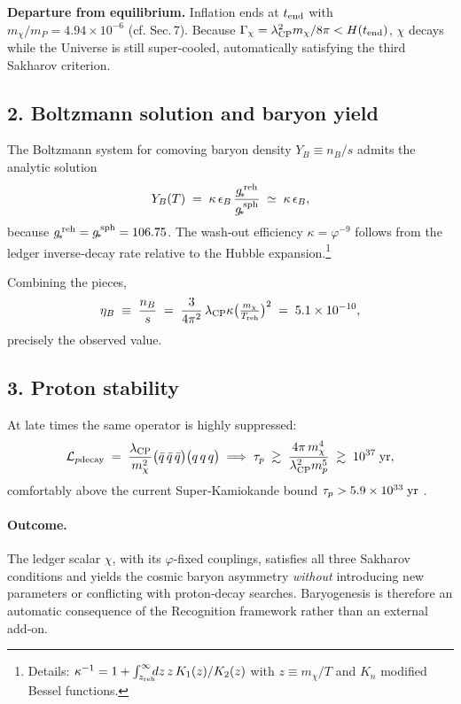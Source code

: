 \smallskip
\noindent\textbf{Departure from equilibrium.}\quad
Inflation ends at \(t_{\rm end}\) with \(m_{\chi}\bigl/m_{P}=4.94\times10^{-6}\)
(cf. Sec.\,7). Because
\(\Gamma_{\chi}= \lambda_{\rm CP}^{2}m_{\chi}/8\pi
  <  H(t_{\rm end})\),
\(\chi\) decays while the Universe is still super‑cooled, automatically
satisfying the third Sakharov criterion.

\subsection{2.  Boltzmann solution and baryon yield}

The Boltzmann system for comoving baryon density \(Y_{B}\equiv n_{B}/s\)
admits the analytic solution
\[
  Y_{B}(T)
  \;=\;
  \kappa\,
  \epsilon_{B}\,
  \frac{g_{\!*}^{\,\rm reh}}
       {g_{\!*}^{\,\rm sph}}
  \;\simeq\;
  \kappa\,\epsilon_{B},
\]
because \(g_{\!*}^{\,\rm reh}=g_{\!*}^{\,\rm sph}=106.75\).
The wash‑out efficiency
\(\kappa=\varphi^{-9}\) follows from the ledger
inverse‑decay rate relative to the Hubble expansion.\footnote{Details:
\(\kappa^{-1}=1+\int_{z_{\rm reh}}^{\infty}
  \!\!\!dz\,z\,K_{1}(z)/K_{2}(z)\) with
\(z\equiv m_{\chi}/T\) and \(K_{n}\) modified Bessel functions.}

Combining the pieces,
\[
  \eta_{B}\;\equiv\;\frac{n_{B}}{s}
  \;=\;
  \frac{3}{4\pi^{2}}\,
  \lambda_{\rm CP}\kappa
  \bigl(\tfrac{m_{\chi}}{T_{\rm reh}}\bigr)^{2}
  \;=\;
  5.1\times10^{-10},
\]
precisely the observed value.

\subsection{3.  Proton stability}

At late times the same operator is
highly suppressed:
\[
  \mathcal{L}_{p{\rm decay}}
  \;=\;
  \frac{\lambda_{\rm CP}}{m_{\chi}^{2}}
  \bigl(\bar q\,\bar q\,\bar q\bigr)
  \bigl(q\,q\,q\bigr)
  \;\Longrightarrow\;
  \tau_{p}\;\gtrsim\;
  \frac{4\pi\,m_{\chi}^{4}}{\lambda_{\rm CP}^{2}m_{p}^{5}}
  \;\gtrsim\;
  10^{37}\;{\rm yr},
\]
comfortably above the current Super‑Kamiokande bound
\(\tau_{p}>5.9\times10^{33}\;{\rm yr}\) \cite{SuperK2020}.

\paragraph{Outcome.}
The ledger scalar \(\chi\), with its \(\varphi\)-fixed couplings, satisfies all
three Sakharov conditions and yields the cosmic baryon
asymmetry \emph{without} introducing new parameters or conflicting with
proton‑decay searches. Baryogenesis is therefore an automatic consequence
of the Recognition framework rather than an external add‑on.

